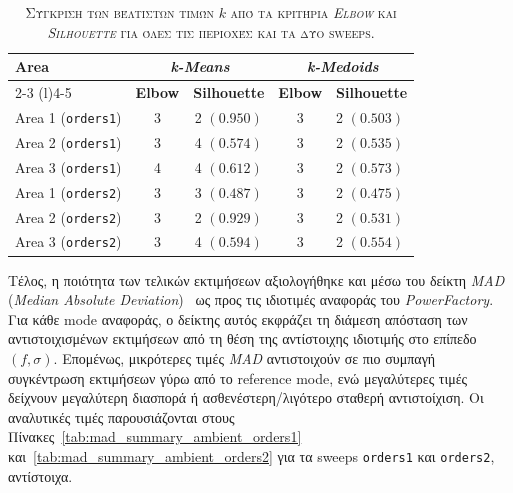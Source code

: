 \documentclass[a4paper,12pt,twoside,openright]{report}
\begin{document}
\begin{table}[!t]
\centering
\caption{\textsc{Σύγκριση των βέλτιστων τιμών \(k\) από τα κριτήρια \textit{Elbow} και \textit{Silhouette} για όλες τις περιοχές και τα δύο sweeps.}}
\label{tab:silhouette_summary_ambient}
\footnotesize
\renewcommand{\arraystretch}{1.2}
\setlength{\tabcolsep}{4pt}
\begin{tabular}{lcccl}
\toprule
\textbf{Area} & \multicolumn{2}{c}{\textbf{\textit{k-Means}}} & \multicolumn{2}{c}{\textbf{\textit{k-Medoids}}} \\
\cmidrule(lr){2-3} \cmidrule(l){4-5}
 & \textbf{Elbow} & \textbf{Silhouette} & \textbf{Elbow} & \textbf{Silhouette} \\
\midrule
Area 1 (\texttt{orders1}) & 3 & 2 $(0.950)$ & 3 & 2 $(0.503)$ \\
Area 2 (\texttt{orders1}) & 3 & 4 $(0.574)$ & 3 & 2 $(0.535)$ \\
Area 3 (\texttt{orders1}) & 4 & 4 $(0.612)$ & 3 & 2 $(0.573)$ \\
Area 1 (\texttt{orders2}) & 3 & 3 $(0.487)$ & 3 & 2 $(0.475)$ \\
Area 2 (\texttt{orders2}) & 3 & 2 $(0.929)$ & 3 & 2 $(0.531)$ \\
Area 3 (\texttt{orders2}) & 3 & 4 $(0.594)$ & 3 & 2 $(0.554)$ \\
\bottomrule
\end{tabular}
\end{table}

Τέλος, η ποιότητα των τελικών εκτιμήσεων αξιολογήθηκε και μέσω του δείκτη \textit{MAD} (\textit{Median Absolute Deviation})~\cite{modal2018} ως προς τις ιδιοτιμές αναφοράς του \textit{PowerFactory}. Για κάθε mode αναφοράς, ο δείκτης αυτός εκφράζει τη διάμεση απόσταση των αντιστοιχισμένων εκτιμήσεων από τη θέση της αντίστοιχης ιδιοτιμής στο επίπεδο \((f,\sigma)\). Επομένως, μικρότερες τιμές \textit{MAD} αντιστοιχούν σε πιο συμπαγή συγκέντρωση εκτιμήσεων γύρω από το reference mode, ενώ μεγαλύτερες τιμές δείχνουν μεγαλύτερη διασπορά ή ασθενέστερη/λιγότερο σταθερή αντιστοίχιση. Οι αναλυτικές τιμές παρουσιάζονται στους Πίνακες~\ref{tab:mad_summary_ambient_orders1} και~\ref{tab:mad_summary_ambient_orders2} για τα sweeps \texttt{orders1} και \texttt{orders2}, αντίστοιχα.
\end{document}
